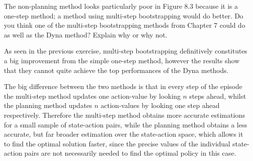 
\begin{exercise}[Exercise 8.1]

The non-planning method looks particularly poor in Figure 8.3 because it is
a one-step method; a method using multi-step bootstrapping would do better.
Do you think one of the multi-step bootstrapping methods from Chapter 7
could do as well as the Dyna method? Explain why or why not.

\end{exercise}


\begin{solution}

As seen in the previous exercise, multi-step bootstrapping
definitively constitutes a big improvement from the simple one-step method,
however the results show that they cannot quite achieve the top performances
of the Dyna methods. 

The big difference between the two methods is that in every step of the episode
the multi-step method updates one action-value by looking $n$ steps ahead, whilst
the planning method updates $n$ action-values by looking one step ahead respectively.
Therefore the multi-step method obtains more accurate estimations for a small sample
of state-action pairs, while the planning method obtains a less accurate, but far broader
estimation over the state-action space, which allows it to find the optimal solution faster,
since the precise values of the individual state-action pairs are not necessarily needed to find the
optimal policy in this case.

\end{solution}

